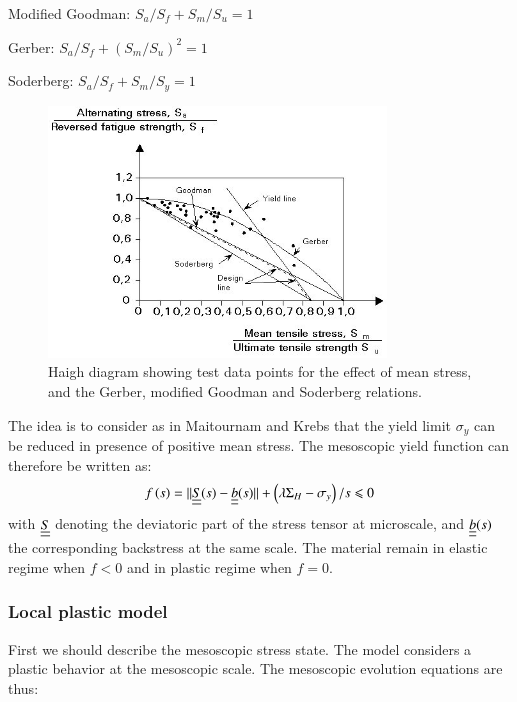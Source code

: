 \documentclass[3p,times,procedia,number]{elsarticle}
\begin{document}
\vspace{6pt}
Modified Goodman: $S_a/S_f + S_m/S_u = 1$

\vspace{6pt}
Gerber: $S_a/ S_f + (S_m/ S_u)^2 = 1$

\vspace{6pt}
Soderberg: $S_a/S_f+S_m/S_y=1$

\begin{figure}[h!]
	\centering
	\includegraphics[width=0.8\textwidth]{figures//Gerber.png} 
	\caption{Haigh diagram showing test data points for the effect of mean stress, and the Gerber, modified Goodman and Soderberg relations.}
	\label{haigh}
\end{figure}


The idea is to consider as in Maitournam and Krebs\cite{Maitournam2011232} that the yield limit $\sigma_y$ can be reduced in presence of positive mean stress. The mesoscopic yield function can therefore be written as:
\begin{equation}
	f\left(s\right)=||\uline{\uline{S}}(s)-\uline{\uline{b}}(s)||+\left( \lambda \Sigma_H-\sigma_y\right) /s\leqslant 0
	\label{yieldfun}
\end{equation}
with $\uline{\uline{S}}$ denoting the deviatoric part of the stress tensor at microscale, and $\uline{\uline{b}}(s)$ the corresponding backstress at the same scale. The material remain in elastic regime when $f<0$ and in plastic regime when $f=0$.

\subsubsection{Local plastic model}
First we should describe the mesoscopic stress state.  The model considers a plastic 
behavior at the mesoscopic scale. The mesoscopic evolution equations are thus:
\end{document}

